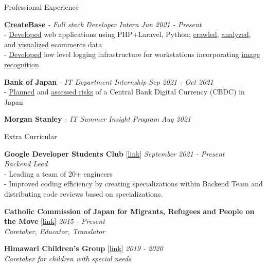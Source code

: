 \documentclass{resume} %
\begin{document}
\begin{rSection}{Professional Experience}

{\bf \href{https://createbase.work/}{CreateBase}} {\textit{- Full stack Developer Intern }} \hfill {\em Jun 2021 - Present} 
\\- \uline{Developed} web applications using PHP+Laravel, Python; \uline{crawled}, \uline{analyzed}, and \uline{visualized} ecommerce data
\\- \uline{Developed} low level logging infrastructure for workstations incorporating \uline{image recognition}

{\bf Bank of Japan}{\textit{ - IT Department Internship}} \hfill {\em Sep 2021 - Oct 2021} 
\\- \uline{Planned} and \uline{assessed risks} of a Central Bank Digital Currency (CBDC) in Japan 

{\bf Morgan Stanley}\textit{ - IT Summer Insight Program} \hfill {\em Aug 2021} 
\end{rSection}
\begin{rSection}{Extra Curricular}

{\bf Google Developer Students Club }[\href{https://gdsc.community.dev/waseda-university/}{link}] \hfill {\em September 2021 - Present} \\
{\textit{Backend Lead}}\\
- Leading a team of 20+ engineers
\\- Improved coding efficiency by creating specializations within Backend Team and distributing code reviews based on specializations.


{\bf Catholic Commission of Japan for Migrants, Refugees and People on the
Move} [\href{https://www.cbcj.catholic.jp/english/japan/comt/migrantsrefugees_e/}{link}] \hfill {\em 2015 - Present} \\
{\textit{Caretaker, Educator, Translator}}

{\bf Himawari Children's Group } [\href{https://www.waseda.jp/inst/wavoc/news/2020/04/01/5313/}{link}] \hfill {\em 2019 - 2020} \\
{\textit{Caretaker for children with special needs}}

\end{rSection}
\end{document}
